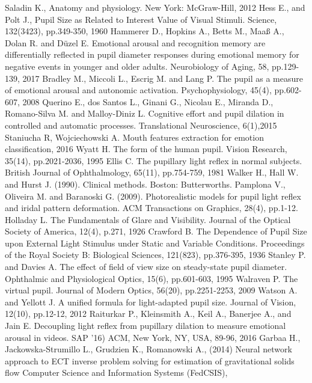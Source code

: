 \documentclass[USenglish,twocolumn]{article}
\begin{document}
\begin{thebibliography}{99}
Saladin K.,  Anatomy and physiology. New York: McGraw-Hill, 2012
Hess E., and Polt J.,  Pupil Size as Related to Interest Value of Visual Stimuli. Science, 132(3423), pp.349-350, 1960
Hammerer D., Hopkins A., Betts M., Maaß A., Dolan R. and Düzel E. Emotional arousal and recognition memory are differentially reflected in pupil diameter responses during emotional memory for negative events in younger and older adults. Neurobiology of Aging, 58, pp.129-139, 2017
Bradley M., Miccoli L., Escrig M. and Lang P. The pupil as a measure of emotional arousal and autonomic activation. Psychophysiology, 45(4), pp.602-607, 2008
Querino E., dos Santos L., Ginani G., Nicolau E., Miranda D., Romano-Silva M. and Malloy-Diniz L. Cognitive effort and pupil dilation in controlled and automatic processes. Translational Neuroscience, 6(1),2015
Staniucha R, Wojciechowski A. Mouth features extraction for emotion classification, 2016
Wyatt H. The form of the human pupil. Vision Research, 35(14), pp.2021-2036, 1995
Ellis C. The pupillary light reflex in normal subjects. British Journal of Ophthalmology, 65(11), pp.754-759, 1981
Walker H., Hall W. and Hurst J. (1990). Clinical methods. Boston: Butterworths.
Pamplona V., Oliveira M. and Baranoski G. (2009). Photorealistic models for pupil light reflex and iridal pattern deformation. ACM Transactions on Graphics, 28(4), pp.1-12.
Holladay L. The Fundamentals of Glare and Visibility. Journal of the Optical Society of America, 12(4), p.271, 1926
Crawford B. The Dependence of Pupil Size upon External Light Stimulus under Static and Variable Conditions. Proceedings of the Royal Society B: Biological Sciences, 121(823), pp.376-395, 1936
Stanley P. and Davies A. The effect of field of view size on steady-state pupil diameter. Ophthalmic and Physiological Optics, 15(6), pp.601-603, 1995
Walraven P. The virtual pupil. Journal of Modern Optics, 56(20), pp.2251-2253, 2009
Watson A. and Yellott J. A unified formula for light-adapted pupil size. Journal of Vision, 12(10), pp.12-12, 2012
Raiturkar P., Kleinsmith  A., Keil A., Banerjee A., and Jain E. Decoupling light reflex from pupillary dilation to measure emotional arousal in videos. SAP '16) ACM, New York, NY, USA, 89-96,  2016
Garbaa H., Jackowska-Strumillo L., Grudzien  K., Romanowski A., (2014) Neural network approach to ECT inverse problem solving for estimation of gravitational solids flow Computer Science and Information Systems (FedCSIS),

\end{thebibliography}
\end{document}
